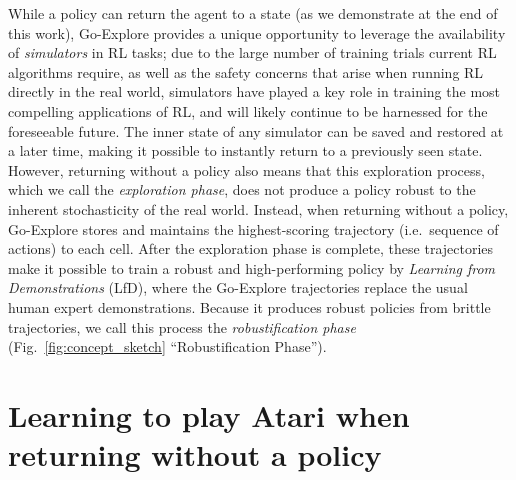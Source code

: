 \documentclass{nature}
\renewcommand*{\cite}[1]{\supercite{#1}}
\begin{document}
While a policy can return the agent to a state (as we demonstrate at the end of this work), Go-Explore provides a unique opportunity to leverage the availability of \emph{simulators} in RL tasks; 
due to the large number of training trials current RL algorithms require, as well as the safety concerns that arise when running RL directly in the real world, simulators have played a key role in training the most compelling applications of RL\cite{cully2015robots,andrychowicz2020learning,peng2018sim,tan2018sim}, and will likely continue to be harnessed for the foreseeable future.
The inner state of any simulator can be saved and restored at a later time, making it possible to instantly return to a previously seen state.
However, returning without a policy 
also means that this exploration process, which we call the \emph{exploration phase}, does not produce a policy robust to the inherent stochasticity of the real world.
Instead, when returning without a policy, Go-Explore stores and maintains the highest-scoring trajectory (i.e.\ sequence of actions) to each cell.
After the exploration phase is complete, these trajectories make it possible to train a robust and high-performing policy by \emph{Learning from Demonstrations} (LfD)\cite{hester2017deep}, where the Go-Explore trajectories replace the usual human expert demonstrations.
Because it produces robust policies from brittle trajectories, we call this process the \emph{robustification phase} (Fig.~\ref{fig:concept_sketch} ``Robustification Phase'').

\section*{Learning to play Atari when returning without a policy}
\label{sec:deterministic}
\end{document}

